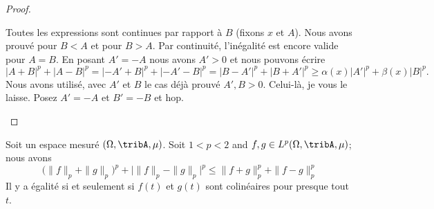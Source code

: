 \begin{proof}
\begin{subproof}
\begin{itemize}
			\end{itemize}
			\spitem[Pour \( 0<A=B\)]
			Toutes les expressions sont continues par rapport à \( B\) (fixons \( x\) et \( A\)). Nous avons prouvé pour \( B<A\) et pour \( B>A\). Par continuité, l'inégalité est encore valide pour \( A=B\).
			\spitem[Pour \( A<0\), \( B>0\)]
			En posant \( A'=-A\) nous avons \( A'>0\) et nous pouvons écrire
			\begin{equation}
				| A+B |^p+| A-B |^p=| -A'+B |^p+| -A'-B |^p=| B-A' |^p+| B+A' |^p\geq \alpha(x)| A' |^p+\beta(x)| B |^p.
			\end{equation}
			Nous avons utilisé, avec \( A'\) et \( B\) le cas déjà prouvé \( A',B>0\).
			\spitem[Pour \( A>0\), \( B<0\)]
			Celui-là, je vous le laisse.
			\spitem[Pour \( A<0\), \( B<0\)]
			Posez \( A'=-A\) et \( B'=-B\) et hop.
		\end{subproof}
	\end{proof}


	\begin{theorem}       \label{THOooZRRYooBTBQKW}
		Soit un espace mesuré \(  (\Omega,\tribA,\mu)\). Soit \( 1<p<2\) and \( f,g\in L^p(\Omega,\tribA,\mu)\); nous avons
		\begin{equation}
			\big( \| f \|_p+\| g \|_p \big)^p+\Big| \| f \|_p-\| g \|_p \Big|^p
			\leq \| f+g \|_p^p+\| f-g \|_p^p
		\end{equation}
		Il y a égalité si et seulement si \( f(t) \) et \( g(t)\) sont colinéaires pour presque tout \( t\).
	\end{theorem}

